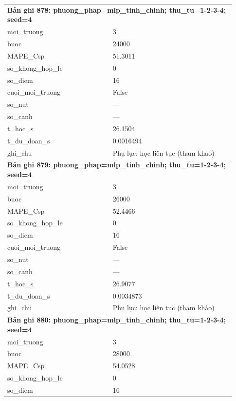 \begin{longtable}{p{0.43\linewidth}p{0.50\linewidth}}
\midrule
\multicolumn{2}{p{0.95\linewidth}}{\textbf{Bản ghi 878: phuong\_phap=mlp\_tinh\_chinh; thu\_tu=1-2-3-4; seed=4}} \\
moi\_\allowbreak truong & 3 \\
buoc & 24000 \\
MAPE\_\allowbreak Csp & 51.3011 \\
so\_\allowbreak khong\_\allowbreak hop\_\allowbreak le & 0 \\
so\_\allowbreak diem & 16 \\
cuoi\_\allowbreak moi\_\allowbreak truong & False \\
so\_\allowbreak nut & — \\
so\_\allowbreak canh & — \\
t\_\allowbreak hoc\_\allowbreak s & 26.1504 \\
t\_\allowbreak du\_\allowbreak doan\_\allowbreak s & 0.0016494 \\
ghi\_\allowbreak chu & Phụ lục: học liên tục (tham khảo) \\
\midrule
\multicolumn{2}{p{0.95\linewidth}}{\textbf{Bản ghi 879: phuong\_phap=mlp\_tinh\_chinh; thu\_tu=1-2-3-4; seed=4}} \\
moi\_\allowbreak truong & 3 \\
buoc & 26000 \\
MAPE\_\allowbreak Csp & 52.4466 \\
so\_\allowbreak khong\_\allowbreak hop\_\allowbreak le & 0 \\
so\_\allowbreak diem & 16 \\
cuoi\_\allowbreak moi\_\allowbreak truong & False \\
so\_\allowbreak nut & — \\
so\_\allowbreak canh & — \\
t\_\allowbreak hoc\_\allowbreak s & 26.9077 \\
t\_\allowbreak du\_\allowbreak doan\_\allowbreak s & 0.0034873 \\
ghi\_\allowbreak chu & Phụ lục: học liên tục (tham khảo) \\
\midrule
\multicolumn{2}{p{0.95\linewidth}}{\textbf{Bản ghi 880: phuong\_phap=mlp\_tinh\_chinh; thu\_tu=1-2-3-4; seed=4}} \\
moi\_\allowbreak truong & 3 \\
buoc & 28000 \\
MAPE\_\allowbreak Csp & 54.0528 \\
so\_\allowbreak khong\_\allowbreak hop\_\allowbreak le & 0 \\
so\_\allowbreak diem & 16 \\

\end{longtable}
